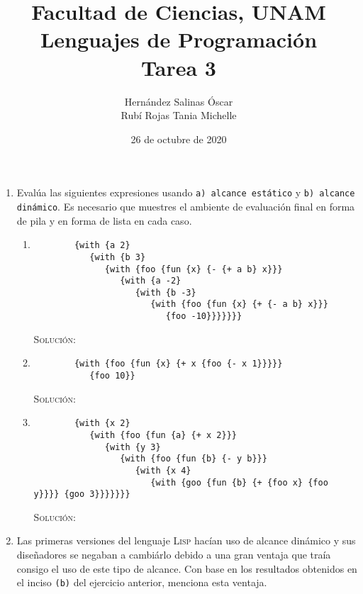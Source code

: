 \documentclass[letterpaper,11pt]{article}
\title{Facultad de Ciencias, UNAM \\ 
       Lenguajes de Programación \\ 
       Tarea 3}
\author{Hernández Salinas Óscar \\ 
        Rubí Rojas Tania Michelle }
\date{26 de octubre de 2020}
\begin{document}
\maketitle

\begin{enumerate}
    \item Evalúa las siguientes expresiones usando \texttt{a) alcance estático}
    y \texttt{b) alcance dinámico}. Es necesario que muestres el ambiente de 
    evaluación final en forma de pila y en forma de lista en cada caso.
    \begin{enumerate}
        \item 
        \begin{verbatim}
        {with {a 2} 
           {with {b 3} 
              {with {foo {fun {x} {- {+ a b} x}}} 
                 {with {a -2} 
                    {with {b -3} 
                       {with {foo {fun {x} {+ {- a b} x}}} 
                          {foo -10}}}}}}}
        \end{verbatim}

        \textsc{Solución:}

        \item 
        \begin{verbatim}
        {with {foo {fun {x} {+ x {foo {- x 1}}}}} 
           {foo 10}}
        \end{verbatim}

        \textsc{Solución:}

        \item 
        \begin{verbatim}
        {with {x 2} 
           {with {foo {fun {a} {+ x 2}}} 
              {with {y 3} 
                 {with {foo {fun {b} {- y b}}} 
                    {with {x 4} 
                       {with {goo {fun {b} {+ {foo x} {foo y}}}} {goo 3}}}}}}}
        \end{verbatim}

        \textsc{Solución:}
    \end{enumerate}

    \item Las primeras versiones del lenguaje \textsc{Lisp} hacían uso de 
    alcance dinámico y sus diseñadores se negaban a cambiárlo debido a una 
    gran ventaja que traía consigo el uso de este tipo de alcance. Con base 
    en los resultados obtenidos en el inciso \texttt{(b)} del ejercicio 
    anterior, menciona esta ventaja.


\end{enumerate}
\end{document}
